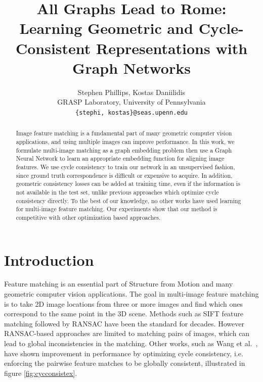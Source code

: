 \documentclass[10pt,twocolumn,letterpaper]{article}
\begin{document}
\title{All Graphs Lead to Rome: Learning Geometric and Cycle-Consistent Representations with Graph Networks}

\author{Stephen Phillips, Kostas Daniilidis \\
GRASP Laboratory, University of Pennsylvania\\
{\tt\small \{stephi, kostas\}@seas.upenn.edu}
}

\maketitle


\begin{abstract}
    Image feature matching is a fundamental part of many geometric computer vision applications, and using multiple images can improve performance.
    In this work, we formulate multi-image matching as a graph embedding problem then use a Graph Neural Network to learn an appropriate embedding function for aligning image features.
    We use cycle consistency to train our network in an unsupervised fashion, since ground truth correspondence is difficult or expensive to acquire.
    In addition, geometric consistency losses can be added at training time, even if the information is not available in the test set, unlike previous approaches which optimize cycle consistency directly.
    To the best of our knowledge, no other works have used learning for multi-image feature matching.
    Our experiments show that our method is competitive with other optimization based approaches.
\end{abstract}

\section{Introduction}

Feature matching is an essential part of Structure from Motion and many geometric computer vision applications.
The goal in multi-image feature matching is to take 2D image locations from three or more images and find which ones correspond to the same point in the 3D scene.
Methods such as SIFT feature matching \cite{lowe2004distinctive} followed by RANSAC \cite{fischler1981random} have been the standard for decades.
However RANSAC-based approaches are limited to matching pairs of images, which can lead to global inconsistencies in the matching.
Other works, such as Wang et al.~\cite{wang2017multi}, have shown improvement in performance by optimizing cycle consistency, i.e. enforcing the pairwise feature matches to be globally consistent, illustrated in figure \ref{fig:cycconsistex}.
\end{document}
